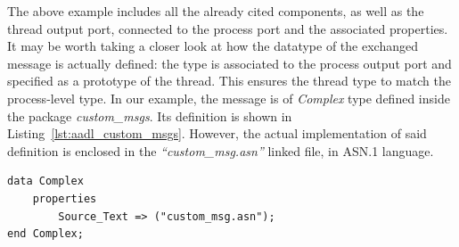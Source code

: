 The above example includes all the already cited components, as well as the thread output port, connected to the process port and the associated properties. It may be worth taking a closer look at how the datatype of the exchanged message is actually defined: the type is associated to the process output port and specified as a prototype of the thread. This ensures the thread type to match the process-level type.
In our example, the message is of \textit{Complex} type defined inside the package \textit{custom\_msgs}. Its definition is shown in Listing~\ref{lst:aadl_custom_msgs}. However, the actual implementation of said definition is enclosed in the \textit{``custom\_msg.asn''} linked file, in ASN.1 language.

\begin{lstlisting}[frame=tb,caption={AADL representation of a custom message},label=lst:aadl_custom_msgs]
data Complex
 	properties
 		Source_Text => ("custom_msg.asn");
end Complex;
\end{lstlisting}


